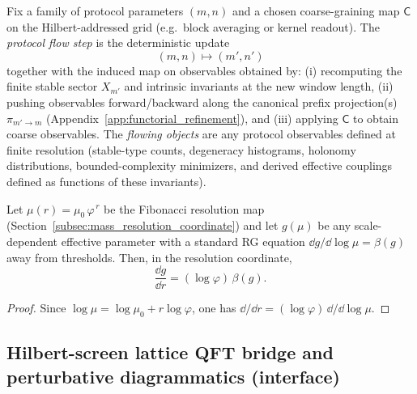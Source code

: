 \begin{definition}\label{def:protocol_flow_step}
Fix a family of protocol parameters $(m,n)$ and a chosen coarse-graining map $\mathsf{C}$ on the Hilbert-addressed grid (e.g.\ block averaging or kernel readout).
The \emph{protocol flow step} is the deterministic update
\[
(m,n)\mapsto(m',n')
\]
together with the induced map on observables obtained by:
(i) recomputing the finite stable sector $X_{m'}$ and intrinsic invariants at the new window length,
(ii) pushing observables forward/backward along the canonical prefix projection(s) $\pi_{m'\to m}$ (Appendix~\ref{app:functorial_refinement}),
and (iii) applying $\mathsf{C}$ to obtain coarse observables.
The \emph{flowing objects} are any protocol observables defined at finite resolution (stable-type counts, degeneracy histograms, holonomy distributions, bounded-complexity minimizers, and derived effective couplings defined as functions of these invariants).
\end{definition}

\begin{proposition}\label{prop:rg_dictionary_r}
Let $\mu(r)=\mu_0\,\varphi^{\,r}$ be the Fibonacci resolution map (Section~\ref{subsec:mass_resolution_coordinate}) and let $g(\mu)$ be any scale-dependent effective parameter with a standard RG equation $\dd g/\dd\log\mu=\beta(g)$ away from thresholds.
Then, in the resolution coordinate,
\[
\frac{\dd g}{\dd r}=(\log\varphi)\,\beta(g).
\]
\end{proposition}
\begin{proof}
Since $\log\mu=\log\mu_0+r\log\varphi$, one has $\dd/\dd r=(\log\varphi)\,\dd/\dd\log\mu$.
\end{proof}

\subsection{Hilbert-screen lattice QFT bridge and perturbative diagrammatics (interface)}
\label{subsec:hilbert_screen_lattice_qft_bridge}

